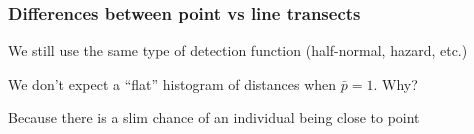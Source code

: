 \documentclass[color=usenames,dvipsnames]{beamer}\usepackage[]{graphicx}\usepackage[]{color}
\begin{document}

\begin{frame}
  \frametitle{Differences between point vs line transects}
  \large
  {We still use the same type of detection function (half-normal,
    hazard, etc.) \par}
  \pause
  \vfill %
  {We don't expect a ``flat'' histogram of distances when
    $\bar{p}=1$. Why? \par}
  \pause
  \vfill %
  {Because there is a slim chance of an individual being
    close to point} \par
\end{frame}





\end{document}
